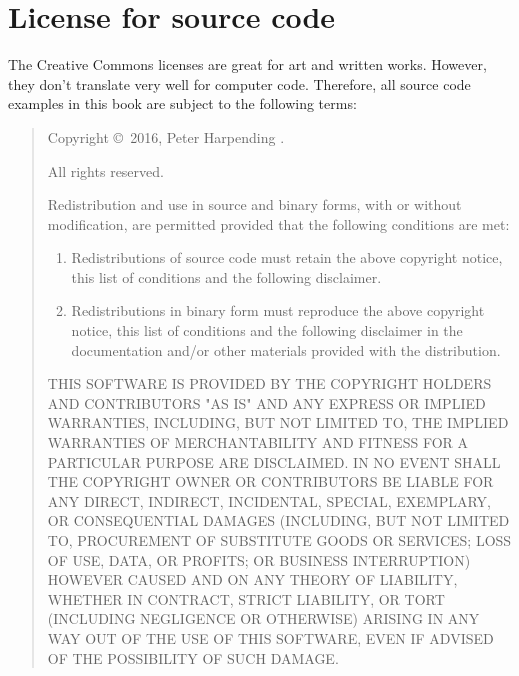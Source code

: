 \chapter{License for source code}
\label{bsd-license}

The Creative Commons licenses are great for art and written
works. However, they don't translate very well for computer
code. Therefore, all source code examples in this book are subject to
the following terms:

\noindent\hrulefill
\begin{quote}
  \footnotesize
  Copyright \copyright\ 2016, Peter Harpending
  .

  All rights reserved.

  Redistribution and use in source and binary forms, with or without
  modification, are permitted provided that the following conditions
  are met:

  \begin{enumerate}
  \item Redistributions of source code must retain the above copyright
    notice, this list of conditions and the following disclaimer.
  \item Redistributions in binary form must reproduce the above
    copyright notice, this list of conditions and the following
    disclaimer in the documentation and/or other materials provided
    with the distribution.
  \end{enumerate}

  THIS SOFTWARE IS PROVIDED BY THE COPYRIGHT HOLDERS AND CONTRIBUTORS
  "AS IS" AND ANY EXPRESS OR IMPLIED WARRANTIES, INCLUDING, BUT NOT
  LIMITED TO, THE IMPLIED WARRANTIES OF MERCHANTABILITY AND FITNESS
  FOR A PARTICULAR PURPOSE ARE DISCLAIMED. IN NO EVENT SHALL THE
  COPYRIGHT OWNER OR CONTRIBUTORS BE LIABLE FOR ANY DIRECT, INDIRECT,
  INCIDENTAL, SPECIAL, EXEMPLARY, OR CONSEQUENTIAL DAMAGES (INCLUDING,
  BUT NOT LIMITED TO, PROCUREMENT OF SUBSTITUTE GOODS OR SERVICES;
  LOSS OF USE, DATA, OR PROFITS; OR BUSINESS INTERRUPTION) HOWEVER
  CAUSED AND ON ANY THEORY OF LIABILITY, WHETHER IN CONTRACT, STRICT
  LIABILITY, OR TORT (INCLUDING NEGLIGENCE OR OTHERWISE) ARISING IN
  ANY WAY OUT OF THE USE OF THIS SOFTWARE, EVEN IF ADVISED OF THE
  POSSIBILITY OF SUCH DAMAGE.
\end{quote}
\noindent\hrulefill